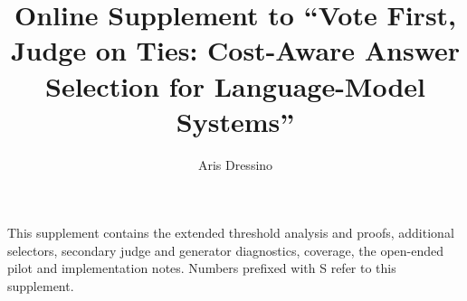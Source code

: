 \documentclass[11pt]{article}
\title{Online Supplement to ``Vote First, Judge on Ties: Cost-Aware Answer Selection for Language-Model Systems''}
\author{Aris Dressino}
\date{}
\begin{document}
\maketitle

This supplement contains the extended threshold analysis and proofs,
additional selectors, secondary judge and generator diagnostics, coverage,
the open-ended pilot and implementation notes. Numbers prefixed with S
refer to this supplement.





\end{document}
